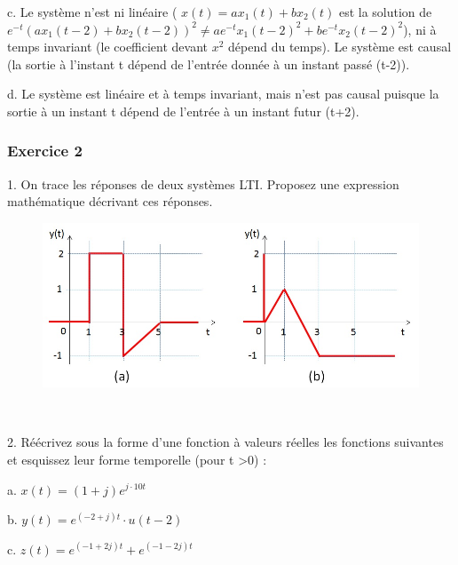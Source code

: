\documentclass[11pt]{report}
\begin{document}
 	\vspace{0.5\baselineskip}
 	c. Le système n'est ni linéaire ( $x(t)= ax_{1}(t)+bx_{2}(t)$ est la solution de $e^{-t}(ax_{1}(t-2)+bx_{2}(t-2))^{2} \neq ae^{-t}x_{1}(t-2)^{2}+be^{-t}x_{2}(t-2)^{2}$), ni à temps invariant (le coefficient devant $x^{2}$ dépend du temps). Le système est causal (la sortie à l'instant t dépend de l'entrée donnée à un instant passé (t-2)).
 	
 	\vspace{0.5\baselineskip}
 	d. Le système est linéaire et à temps invariant, mais n'est pas causal puisque la sortie à un instant t dépend de l'entrée à un instant futur (t+2).
 	
 	\vspace{1\baselineskip}
 	
 	
 	\subsubsection{Exercice 2} 
 	1. On trace les réponses de deux systèmes LTI. Proposez une expression mathématique décrivant ces réponses.
 	\begin{figure}[h!]
 		\centering
 		\includegraphics[scale=0.5]{images/Exo_2_2.jpg} 
 	\end{figure} \\
 
 	\vspace{0.5\baselineskip}
 	
 	2. Réécrivez sous la forme d'une fonction à valeurs réelles les fonctions suivantes et esquissez leur forme temporelle (pour t >0) :
 	
 	a. $x(t) = (1+j)e^{j\cdot 10t}$ 
 	
 	b. $y(t) = e^{(-2+j)t}\cdot u(t-2)$ 
 	
 	c. $z(t) = e^{(-1+2j)t}+e^{(-1-2j)t}$
 	
 	\vspace{1\baselineskip}	
 	
\end{document}
